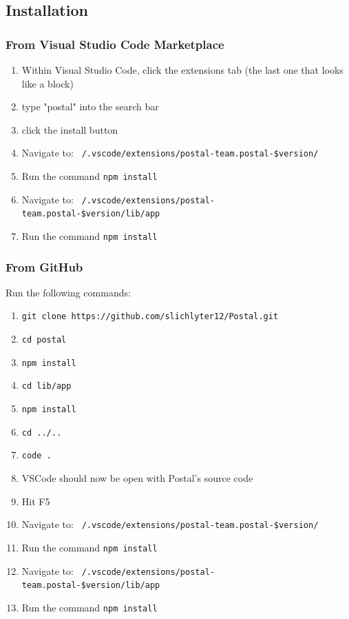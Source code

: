 \documentclass[letterpaper,10pt,titlepage,draftclsnofoot,onecolumn,onesided] {IEEEtran}
\begin{document}
\subsection{Installation}

\subsubsection{From Visual Studio Code Marketplace}
\begin{enumerate}
	\item	Within Visual Studio Code, click the extensions tab (the last one that looks like a block)
	\item 	type "postal" into the search bar
	\item 	click the install button
	\item 	Navigate to: \texttt{~/.vscode/extensions/postal-team.postal-\$version/}
	\item 	Run the command \texttt{npm install}
	\item 	Navigate to: \texttt{~/.vscode/extensions/postal-team.postal-\$version/lib/app}
	\item 	Run the command \texttt{npm install}
\end{enumerate} 

\subsubsection{From GitHub} Run the following commands:
\begin{enumerate}
	\item 	\texttt{git clone https://github.com/slichlyter12/Postal.git}
	\item 	\texttt{cd postal}
	\item 	\texttt{npm install}
	\item 	\texttt{cd lib/app}
	\item 	\texttt{npm install}
	\item 	\texttt{cd ../..}
	\item 	\texttt{code .}
	\item 	VSCode should now be open with Postal's source code
	\item 	Hit F5
	\item 	Navigate to: \texttt{~/.vscode/extensions/postal-team.postal-\$version/}
	\item 	Run the command \texttt{npm install}
	\item 	Navigate to: \texttt{~/.vscode/extensions/postal-team.postal-\$version/lib/app}
	\item 	Run the command \texttt{npm install}
\end{enumerate}
\end{document}
